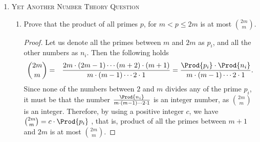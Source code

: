 \documentclass[11pt]{article}
\begin{document}
\begin{enumerate}
\begin{proof}
        Therefore, total number of points on this straight
        line, defined by a pair $(a,b)$, is 
        $\floor{n/b}$. Thus,
        \begin{eqnarray*}
            \Sum_{b=2}^n \pth{\floor{n/b}\cdot |Q(n, b)| \MakeBig} 
            = \Sum_{b=2}^n \pth{\floor{n/b}\cdot
               \phi(b)\MakeBig} 
            = \frac{n(n-1)}2.
        \end{eqnarray*}
        We overestimate $\floor{n/b}$ as $n/b$, and remove
        $n$ from both sides, then we have $\frac{n(n-1)}2
        \le \Sum_{b=2}^n \pth{n/b\cdot \phi(b)}$. Namely,
        \begin{eqnarray*}
            \frac{n-1}2 &\le& \Sum_{b=2}^n \frac{\phi(b)}b
            = \Sum_{b=2}^{\floor{n/4}} \frac{\phi(b)}b 
            + \Sum_{b=\floor{n/4}+1}^n \frac{\phi(b)}b
            \le \frac{n}4 + \Sum_{b=\floor{n/4}+1}^n
            \frac{\phi(b)}b\\
            &\le& \frac{n}4 + \Sum_{b=\floor{n/4}+1}^n \frac{\phi(b)}{n/4}
            \le \frac{n}4 + \Sum_{b=2}^n \frac{\phi(b)}{n/4},
        \end{eqnarray*}
        since $\phi(n) < n)$.  Thus, $\frac{n-2}4 \le
        \Sum_{b=2}^n \frac{\phi(b)}{n/4}$, which implies
        that
        $\frac{n(n-2)}{16} \le \Sum_{b=2}^n \phi(b) = |P(n)|$.
        Namely, $|P(n)| = \Omega(n^2)$.
    \end{proof}
    
    
    \item \textsc{Yet Another Number Theory Question}\\
    
    \begin{enumerate}
        \item {} Prove that the product of all
        primes $p$, for $m <p \leq 2m$ is at most
        $\binom{2m}{m}$.
        
        \begin{proof}
            Let us denote all the primes between $m$ and $2m$ as $p_i$, and
            all the other numbers as $n_i$. Then the following holds
            \begin{eqnarray*}
                {2m\choose{m}} &=& \frac{2m\cdot(2m -
                   1)\cdots(m + 2)
                   \cdot(m + 1)}{m\cdot(m - 1)\cdots{2}\cdot{1}}
                = \frac{\Prod{p_i}\cdot\Prod{n_i}}{m\cdot(m
                - 1)\cdots{2}
                \cdot{1}}.
            \end{eqnarray*}
            Since none of the numbers between $2$ and $m$
            divides any of the prime $p_i$, it must be that
            the number $\frac{\Prod{n_i}}{m\cdot(m -
               1)\cdots{2}\cdot{1}}$ is an integer number,
            as ${2m\choose{m}}$ is an integer. Therefore, by
            using a positive integer $c$, we have
            ${2m\choose{m}} = c\cdot \Prod{p_i}$   , that is,
            product of all the primes between $m+1$ and $2m$
            is at most ${2m}\choose{m}$.
        \end{proof}
        

\end{enumerate}
\end{enumerate}
\end{document}
